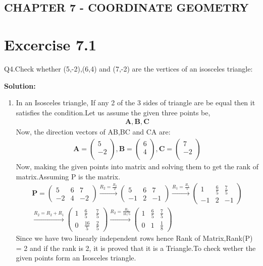 \documentclass[12pt]{article}
\newcommand{\solution}{\noindent \textbf{Solution: }}
\newcommand{\myvec}[1]{\ensuremath{\begin{pmatrix}#1\end{pmatrix}}}
\let\vec\mathbf
\begin{document}
\begin{center}
\section*{CHAPTER 7 - COORDINATE GEOMETRY}

\end{center}
\section*{Excercise 7.1}

Q4.Check whether (5,-2),(6,4) and (7,-2) are the vertices of an isosceles triangle:

\solution
\begin{enumerate}
\item In an Isosceles triangle, If any 2 of the 3 sides of  triangle are be equal then it satisfies the condition.Let us assume the given three points be,
	\begin{align}
\vec{A} , \vec{B} , \vec{C}
	\end{align}
Now, the direction vectors of AB,BC and CA are:
	\begin{align}
	\vec{A} = \myvec{
	    5\\
	   -2\\
		},
	\vec{B} = \myvec{
	    6\\
		4\\
		},
	\vec{C} = \myvec{
		7\\
	   -2\\
	    }
	\end{align}  
Now, making the given points into matrix and solving them to get the rank of matrix.Assuming P is the matrix.
	\begin{align}
\vec{P} = \myvec{
5&6&7\\
-2&4&-2
}\xrightarrow[]{R_2=\frac{R_2}{2}}
\myvec{
5&6&7\\
-1&2&-1
}\xrightarrow[]{R_1=\frac{R_1}{5}}
\myvec{
1&\frac{6}{5}&\frac{7}{5}\\
-1&2&-1
}\\\xrightarrow[]{R_2=R_2+R_1}
\myvec{
1&\frac{6}{5}&\frac{7}{5}\\
0&\frac{16}{5}&\frac{2}{5}
}\xrightarrow[]{R_2=\frac{R_2}{16/5}}
\myvec{
1&\frac{6}{5}&\frac{7}{5}\\
0&1&\frac{1}{8}
}
	\end{align}
Since we have two linearly independent rows hence Rank of Matrix,Rank(P) = 2 and if the rank is 2, it is proved that it is a Triangle.To check wether the given points form an Isosceles triangle.

\end{enumerate}
\end{document}
